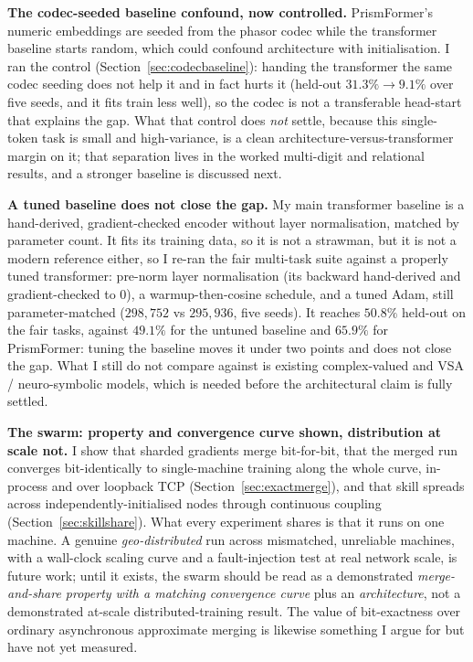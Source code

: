\documentclass[11pt]{article}
\begin{document}
\textbf{The codec-seeded baseline confound, now controlled.} PrismFormer's numeric embeddings are seeded
from the phasor codec while the transformer baseline starts random, which could confound architecture
with initialisation. I ran the control (Section~\ref{sec:codecbaseline}): handing the transformer the
same codec seeding does not help it and in fact hurts it (held-out $31.3\%\to9.1\%$ over five seeds, and
it fits train less well), so the codec is not a transferable head-start that explains the gap. What that
control does \emph{not} settle, because this single-token task is small and high-variance, is a clean
architecture-versus-transformer margin on it; that separation lives in the worked multi-digit and
relational results, and a stronger baseline is discussed next.

\textbf{A tuned baseline does not close the gap.} My main transformer baseline is a hand-derived,
gradient-checked encoder without layer normalisation, matched by parameter count. It fits its training
data, so it is not a strawman, but it is not a modern reference either, so I re-ran the fair multi-task
suite against a properly tuned transformer: pre-norm layer normalisation (its backward hand-derived and
gradient-checked to $0$), a warmup-then-cosine schedule, and a tuned Adam, still parameter-matched
($298{,}752$ vs $295{,}936$, five seeds). It reaches $50.8\%$ held-out on the fair tasks, against
$49.1\%$ for the untuned baseline and $65.9\%$ for PrismFormer: tuning the baseline moves it under two
points and does not close the gap. What I still do not compare against is existing complex-valued and
VSA / neuro-symbolic models, which is needed before the architectural claim is fully settled.

\textbf{The swarm: property and convergence curve shown, distribution at scale not.} I show that sharded
gradients merge bit-for-bit, that the merged run converges bit-identically to single-machine training
along the whole curve, in-process and over loopback TCP (Section~\ref{sec:exactmerge}), and that skill
spreads across independently-initialised nodes through continuous coupling (Section~\ref{sec:skillshare}).
What every experiment shares is that it runs on one machine. A genuine \emph{geo-distributed} run across
mismatched, unreliable machines, with a wall-clock scaling curve and a fault-injection test at real
network scale, is future work; until it exists, the swarm should be read as a demonstrated
\emph{merge-and-share property with a matching convergence curve} plus an \emph{architecture}, not a
demonstrated at-scale distributed-training result. The value of bit-exactness over ordinary asynchronous
approximate merging is likewise something I argue for but have not yet measured.
\end{document}
